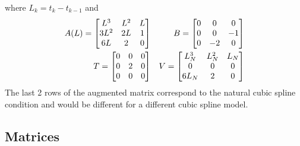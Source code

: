 \documentclass[11pt, fleqn]{article}
\begin{document}
where $L_k=t_k-t_{k-1}$ and
\begin{align*}
    A(L)=\matrixx{L^3 & L^2 & L\\ 3L^2 & 2L & 1\\ 6L & 2 & 0}& &B=\matrixx{0 & 0 & 0\\ 0 & 0 &-1\\ 0 & -2 & 0}\\
    T=\matrixx{0 & 0 & 0\\ 0 & 2 & 0\\ 0 & 0 & 0}& &V=\matrixx{L_N^3 & L_N^2 & L_N\\ 0 & 0 & 0\\ 6L_N & 2 & 0}
\end{align*}
The last 2 rows of the augmented matrix correspond to the natural cubic spline condition and would be different for a different cubic spline model.











\subsection{Matrices}
\end{document}
